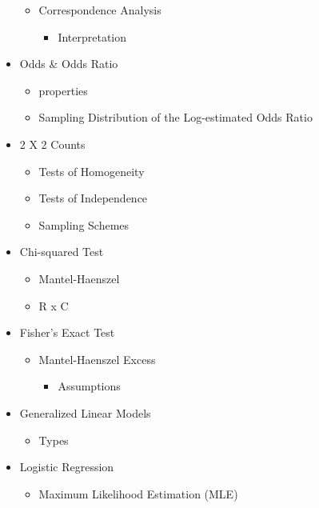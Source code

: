 \documentclass[11pt]{article}
\begin{document}
\begin{itemize}
\begin{itemize}
\item Correspondence Analysis

\begin{itemize}
\item Interpretation
\end{itemize}
\end{itemize}

\item Odds \& Odds Ratio

\begin{itemize}
\item properties
\item Sampling Distribution of the Log-estimated Odds Ratio
\end{itemize}

\item 2 X 2 Counts

\begin{itemize}
\item Tests of Homogeneity
\item Tests of Independence
\item Sampling Schemes
\end{itemize}

\item Chi-squared Test

\begin{itemize}
\item Mantel-Haenszel
\item R x C
\end{itemize}

\item Fisher's Exact Test

\begin{itemize}
\item Mantel-Haenszel Excess

\begin{itemize}
\item Assumptions
\end{itemize}
\end{itemize}

\item Generalized Linear Models

\begin{itemize}
\item Types
\end{itemize}

\item Logistic Regression

\begin{itemize}
\item Maximum Likelihood Estimation (MLE)


\end{itemize}
\end{itemize}
\end{document}
